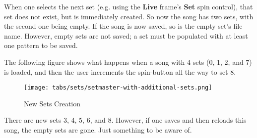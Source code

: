    When one selects the next set (e.g. using the \textbf{Live} frame's
   \textbf{Set} spin control), that set does not exist, but is immediately
   created.  So now the song has two sets, with the second one being empty.
   If the song is now saved, so is the empty set's file name.  However, empty
   sets are not saved; a set must be populated with at least one pattern to be
   saved.

   The following figure shows what happens when a song with 4 sets (0, 1, 2,
   and 7) is loaded, and then the user increments the spin-button all the way
   to set 8.

\begin{figure}[H]
   \centering 
   \texttt{[image: tabs/sets/setmaster-with-additional-sets.png]}
   \caption{New Sets Creation}
   \label{fig:setmaster_set_creation}
\end{figure}

   There are new sets 3, 4, 5, 6, and 8.  However, if one saves and then
   reloads this song, the empty sets are gone.  Just something to be aware of.

